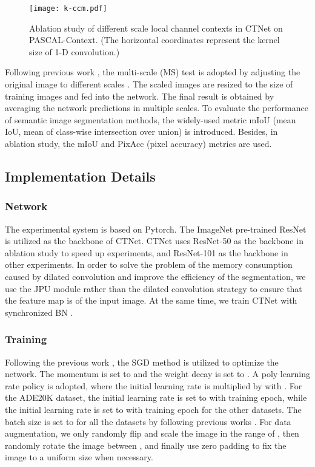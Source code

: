 \documentclass[10pt,journal,cspaper,compsoc]{IEEEtran}
\begin{document}
\begin{figure}
\centering
\texttt{[image: k-ccm.pdf]}
\caption{Ablation study of different scale local channel contexts in CTNet on PASCAL-Context. (The horizontal coordinates represent the kernel size of 1-D convolution.)}
\label{fig7}
\end{figure}
	
Following previous work \cite{huang2019ccnet, fu2019dual, zhang2019co}, the multi-scale (MS) test is adopted by adjusting the original image to different scales . The scaled images are resized to the size of training images and fed into the network. The final result is obtained by averaging the network predictions in multiple scales. To evaluate the performance of semantic image segmentation methods, the widely-used metric mIoU (mean IoU, mean of class-wise intersection over union) is introduced. Besides, in ablation study, the mIoU and PixAcc (pixel accuracy) metrics are used.
	
\subsection{Implementation Details}
\subsubsection{Network}
The experimental system is based on Pytorch. The ImageNet pre-trained ResNet \cite{he2016deep} is utilized as the backbone of CTNet. CTNet uses ResNet-50 as the backbone in ablation study to speed up experiments, and ResNet-101 as the backbone in other experiments. In order to solve the problem of the memory consumption caused by dilated convolution and improve the efficiency of the segmentation, we use the JPU \cite{wu2019fastfcn} module rather than the dilated convolution strategy \cite{huang2019ccnet, fu2019dual, li2019expectation} to ensure that the feature map is  of the input image. At the same time, we train CTNet with synchronized BN \cite{wu2019fastfcn}.
	
\subsubsection{Training}
Following the previous work \cite{chen2017rethinking, zhang2019co}, the SGD method is utilized to optimize the network. The momentum is set to  and the weight decay is set to .  A poly learning rate policy is adopted, where the initial learning rate is multiplied by  with . For the ADE20K dataset, the initial learning rate is set to  with  training epoch, while the initial learning rate is set to  with  training epoch for the other datasets. The batch size is set to  for all the datasets by following previous works \cite{wu2019fastfcn, zhang2019co, yuan2020object}. For data augmentation, we only randomly flip and scale the image in the range of , then randomly rotate the image between , and finally use zero padding to fix the image to a uniform size when necessary.
	
\end{document}
